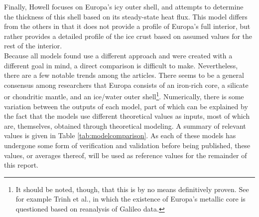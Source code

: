 \documentclass[twocolumn]{article}
\begin{document}
\indent Finally, Howell\cite{howellLikelyThicknessEuropas2021} focuses on Europa's icy outer shell, and attempts to determine the thickness of this shell based on its steady-state heat flux. This model differs from the others in that it does not provide a profile of Europa's full interior, but rather provides a detailed profile of the ice crust based on assumed values for the rest of the interior.\\
\indent Because all models found use a different approach and were created with a different goal in mind, a direct comparison is difficult to make. Nevertheless, there are a few notable trends among the articles. There seems to be a general consensus among researchers that Europa consists of an iron-rich core, a silicate or chondritic mantle, and an ice/water outer shell\footnote{It should be noted, though, that this is by no means definitively proven. See for example Trinh et al.\cite{trinhSlowEvolutionEuropas2023}, in which the existence of Europa's metallic core is questioned based on reanalysis of Galileo data.}. Numerically, there is some variation between the outputs of each model, part of which can be explained by the fact that the models use different theoretical values as inputs, most of which are, themselves, obtained through theoretical modeling. A summary of relevant values is given in Table \ref{tab:modelcomparison}. As each of these models has undergone some form of verification and validation before being published, these values, or averages thereof, will be used as reference values for the remainder of this report.
\end{document}
